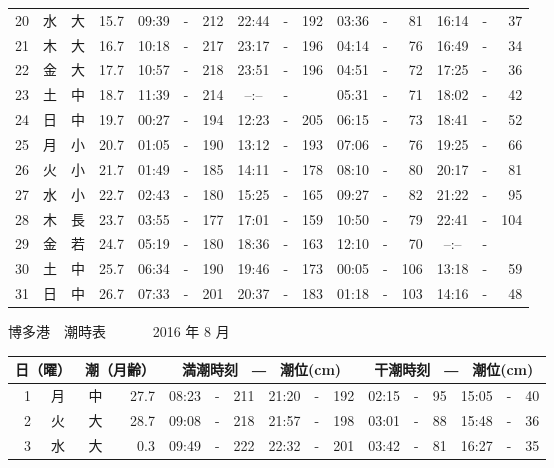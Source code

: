 \documentclass[12pt.a4j]{jsarticle}
\begin{document}
\begin{center}
\begin{table}[ht]
\begin{tabular}{|rc|cr|ccrccr|ccrccr|}
20 & 水 & 大 & 15.7 &  09:39 &-& 212  &  22:44 &-& 192  &   03:36 &-&  81  &   16:14 &-&  37  \\
21 & 木 & 大 & 16.7 &  10:18 &-& 217  &  23:17 &-& 196  &   04:14 &-&  76  &   16:49 &-&  34  \\
22 & 金 & 大 & 17.7 &  10:57 &-& 218  &  23:51 &-& 196  &   04:51 &-&  72  &   17:25 &-&  36  \\
23 & 土 & 中 & 18.7 &  11:39 &-& 214  &  --:-- &-&     &   05:31 &-&  71  &   18:02 &-&  42  \\
24 & 日 & 中 & 19.7 &  00:27 &-& 194  &  12:23 &-& 205  &   06:15 &-&  73  &   18:41 &-&  52  \\
25 & 月 & 小 & 20.7 &  01:05 &-& 190  &  13:12 &-& 193  &   07:06 &-&  76  &   19:25 &-&  66  \\
26 & 火 & 小 & 21.7 &  01:49 &-& 185  &  14:11 &-& 178  &   08:10 &-&  80  &   20:17 &-&  81  \\
27 & 水 & 小 & 22.7 &  02:43 &-& 180  &  15:25 &-& 165  &   09:27 &-&  82  &   21:22 &-&  95  \\
28 & 木 & 長 & 23.7 &  03:55 &-& 177  &  17:01 &-& 159  &   10:50 &-&  79  &   22:41 &-& 104  \\
29 & 金 & 若 & 24.7 &  05:19 &-& 180  &  18:36 &-& 163  &   12:10 &-&  70  &   --:-- &-&     \\
30 & 土 & 中 & 25.7 &  06:34 &-& 190  &  19:46 &-& 173  &   00:05 &-& 106  &   13:18 &-&  59  \\
31 & 日 & 中 & 26.7 &  07:33 &-& 201  &  20:37 &-& 183  &   01:18 &-& 103  &   14:16 &-&  48  \\
   \hline
   \end{tabular}
\end{table}
\newpage
 {\LARGE 博多港　潮時表　　　}
 {\large 2016 年  8 月}\\
 \begin{table}[ht]
    \begin{tabular}{|rc|cr|ccrccr|ccrccr|}
    \hline
    \multicolumn{2}{|c|}{日（曜）} & \multicolumn{2}{c|}{潮（月齢）} & \multicolumn{6}{c|}{満潮時刻　―　潮位(cm)} & \multicolumn{6}{c|}{干潮時刻　―　潮位(cm)} \\
 \hline
 1 & 月 & 中 & 27.7 &  08:23 &-& 211  &  21:20 &-& 192  &   02:15 &-&  95  &   15:05 &-&  40  \\
 2 & 火 & 大 & 28.7 &  09:08 &-& 218  &  21:57 &-& 198  &   03:01 &-&  88  &   15:48 &-&  36  \\
 3 & 水 & 大 &  0.3 &  09:49 &-& 222  &  22:32 &-& 201  &   03:42 &-&  81  &   16:27 &-&  35  \\

\end{tabular}
\end{table}
\end{center}
\end{document}
